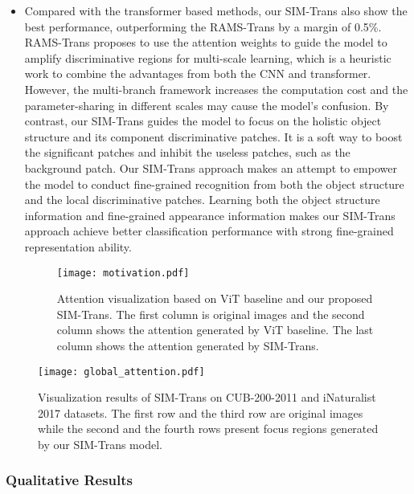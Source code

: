 \documentclass[sigconf, nonacm]{acmart}
\begin{document}
\begin{itemize}[leftmargin=30pt]
\item {Compared with the transformer based methods, our SIM-Trans also show the best performance, outperforming the RAMS-Trans by a margin of 0.5\%. RAMS-Trans proposes to use the attention weights to guide the model to amplify discriminative regions for multi-scale learning, which is a heuristic work to combine the advantages from both the CNN and transformer. However, the multi-branch framework increases the computation cost and the parameter-sharing in different scales may cause the model’s confusion. By contrast, our SIM-Trans guides the model to focus on the holistic object structure and its component discriminative patches. It is a soft way to boost the significant patches and inhibit the useless patches, such as the background patch. Our SIM-Trans approach makes an attempt to empower the model to conduct fine-grained recognition from both the object structure and the local discriminative patches. Learning both the object structure information and fine-grained appearance information makes our SIM-Trans approach achieve better classification performance with strong fine-grained representation ability.}





\begin{figure}[!t]
  \centering
  \texttt{[image: motivation.pdf]}
  \caption{Attention visualization based on ViT baseline and our proposed SIM-Trans. The first column is original images and the second column shows the attention generated by ViT baseline. The last column shows the attention generated by SIM-Trans.}
  \label{motivation}
\end{figure}



\end{itemize}

\begin{figure*}[!t]
  \centering
  \texttt{[image: global\_attention.pdf]}
  \caption{Visualization results of SIM-Trans on CUB-200-2011 and iNaturalist 2017 datasets. The first row and the third row are original images while the second and the fourth rows present focus regions generated by our SIM-Trans model.}
  \label{global_attention}
\end{figure*}









\subsubsection{\textbf{Qualitative Results }}
\end{document}
